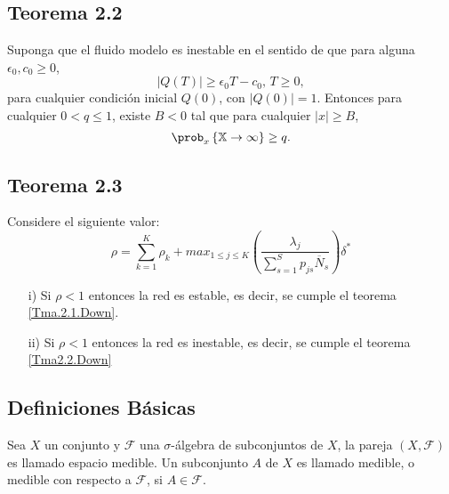 \subsection{Teorema 2.2}

\begin{Teo}\label{Tma2.2.Down}
Suponga que el fluido modelo es inestable en el sentido de que
para alguna $\epsilon_{0},c_{0}\geq0$,
\begin{equation}\label{Eq.Inestability}
|Q\left(T\right)|\geq\epsilon_{0}T-c_{0}\textrm{,   }T\geq0,
\end{equation}
para cualquier condici\'on inicial $Q\left(0\right)$, con
$|Q\left(0\right)|=1$. Entonces para cualquier $0<q\leq1$, existe
$B<0$ tal que para cualquier $|x|\geq B$,
\begin{equation}
\prob_{x}\left\{\mathbb{X}\rightarrow\infty\right\}\geq q.
\end{equation}
\end{Teo}

\subsection{Teorema 2.3}
\begin{Teo}\label{Tma2.3.Down}
Considere el siguiente valor:
\begin{equation}\label{Eq.Rho.1serv}
\rho=\sum_{k=1}^{K}\rho_{k}+max_{1\leq j\leq K}\left(\frac{\lambda_{j}}{\sum_{s=1}^{S}p_{js}\overline{N}_{s}}\right)\delta^{*}
\end{equation}
\begin{itemize}
\item[i)] Si $\rho<1$ entonces la red es estable, es decir, se cumple el teorema \ref{Tma.2.1.Down}.

\item[ii)] Si $\rho<1$ entonces la red es inestable, es decir, se cumple el teorema \ref{Tma2.2.Down}
\end{itemize}
\end{Teo}
\subsection{Definiciones  B\'asicas}
\begin{Def}
Sea $X$ un conjunto y $\mathcal{F}$ una $\sigma$-\'algebra de
subconjuntos de $X$, la pareja $\left(X,\mathcal{F}\right)$ es
llamado espacio medible. Un subconjunto $A$ de $X$ es llamado
medible, o medible con respecto a $\mathcal{F}$, si
$A\in\mathcal{F}$.
\end{Def}


